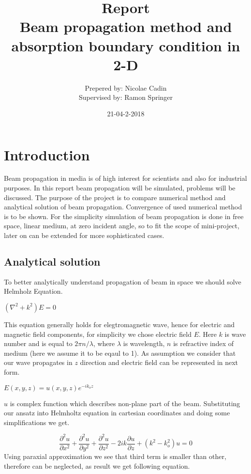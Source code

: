 \documentclass{article}
\title{Report\\Beam propagation method and absorption boundary condition in 2-D}
\date{21-04-2-2018}
\author{Prepered by: Nicolae Cadin \\Supervised by: Ramon Springer}
\begin{document}
	
	
	\maketitle
	\newpage
	\tableofcontents
	
	\newpage
	\section{Introduction}
	Beam propagation in media is of high interest for scientists and also for industrial purposes. 
	In this report beam propagation will be simulated, problems will be discussed. The purpose of the project is to compare numerical method and analytical solution of beam propagation. Convergence of used numerical method is to be shown. For the simplicity simulation of beam propagation is done in free space, linear medium, at zero incident angle, so to fit the scope of mini-project, later on can be extended for more sophisticated cases.
	\subsection{Analytical solution}
	To better analytically understand propagation of beam in space we should solve Helmholz Equation.
	\begin{center}
		$(\nabla^2+k^2)E = 0$		
	\end{center}
	This equation generally holds for elegtromagnetic wave, hence for electric and magnetic field components, for simplicity we chose electric field $E$. Here $k$ is wave number and is equal to $2\pi n/\lambda$, where $\lambda$ is wavelength, $n$ is refractive index of medium (here we assume it to be eqaul to 1). As assumption we consider that our wave propagates in $z$ direction and electric field can be represented in next form.
	\begin{center}
		$E(x,y,z)=u(x,y,z)e^{-ik_oz}$
	\end{center}
	$u$ is complex function which describes non-plane part of the beam. Substituting our ansatz into Helmholtz equation in cartesian coordinates and doing some simplifications we get.

	\[\frac{\partial^2 u}{\partial x^2}+ \frac{\partial^2 u}{\partial y^2}+ \frac{\partial^2 u}{\partial z^2} - 2ik\frac{\partial u}{\partial z}+(k^2-k_o^2)u=0\]
	Using paraxial approximation we see that third term is smaller than other, therefore can be neglected, as result we get following equation.
	
\end{document}

